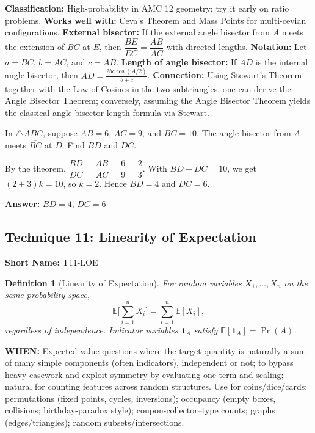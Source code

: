\documentclass[12pt]{article}
\newtheorem{definition}{Definition}[section]
\newenvironment{problem}[1]
{\begin{tcolorbox}[colback=blue!5!white,colframe=blue!75!black,title={#1}]}{\end{tcolorbox}}
\newenvironment{solution}
{\begin{tcolorbox}[colback=green!5!white,colframe=green!75!black,title={Solution}]}{\end{tcolorbox}}
\begin{document}
\textbf{Classification:} High-probability in AMC 12 geometry; try it early on ratio problems.
\textbf{Works well with:} Ceva's Theorem and Mass Points for multi-cevian configurations.
\textbf{External bisector:} If the external angle bisector from $A$ meets the extension of $\overline{BC}$ at $E$, then $\dfrac{BE}{EC} = \dfrac{AB}{AC}$ with directed lengths.
\textbf{Notation:} Let $a = BC$, $b = AC$, and $c = AB$.
\textbf{Length of angle bisector:} If $AD$ is the internal angle bisector, then $\displaystyle AD = \frac{2bc\cos(A/2)}{b+c}$.
\textbf{Connection:} Using Stewart's Theorem together with the Law of Cosines in the two subtriangles, one can derive the Angle Bisector Theorem; conversely, assuming the Angle Bisector Theorem yields the classical angle-bisector length formula via Stewart.

\begin{problem}{Example: Side Partition}
In $\triangle ABC$, suppose $AB = 6$, $AC = 9$, and $BC = 10$. The angle bisector from $A$ meets $\overline{BC}$ at $D$. Find $BD$ and $DC$.
\end{problem}

\begin{solution}
By the theorem, $\dfrac{BD}{DC} = \dfrac{AB}{AC} = \dfrac{6}{9} = \dfrac{2}{3}$. With $BD + DC = 10$, we get $(2+3)k = 10$, so $k = 2$. Hence $BD = 4$ and $DC = 6$.

\textbf{Answer:} $BD = 4$, $DC = 6$
\end{solution}

\subsection{Technique 11: Linearity of Expectation}
\textbf{Short Name:} T11-LOE

\begin{definition}[Linearity of Expectation]
For random variables $X_1,\dots,X_n$ on the same probability space,
\[
\mathbb{E}\Big[\sum_{i=1}^n X_i\Big] = \sum_{i=1}^n \mathbb{E}[X_i],
\]
regardless of independence. Indicator variables $\mathbf{1}_A$ satisfy $\mathbb{E}[\mathbf{1}_A]=\Pr(A)$.
\end{definition}

\textbf{WHEN:} Expected-value questions where the target quantity is naturally a sum of many simple components (often indicators), independent or not; to bypass heavy casework and exploit symmetry by evaluating one term and scaling; natural for counting features across random structures. Use for coins/dice/cards; permutations (fixed points, cycles, inversions); occupancy (empty boxes, collisions; birthday-paradox style); coupon-collector–type counts; graphs (edges/triangles); random subsets/intersections.
\end{document}
